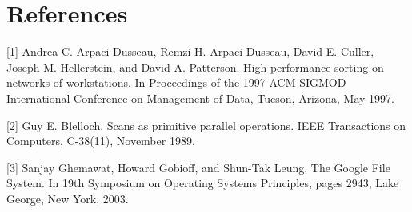 \documentclass[sigconf]{acmart}
\begin{document}
\section{References}



 

[1] Andrea C. Arpaci-Dusseau, Remzi H. Arpaci-Dusseau,
David E. Culler, Joseph M. Hellerstein, and David A. Patterson.
High-performance sorting on networks of workstations.
In Proceedings of the 1997 ACM SIGMOD International
Conference on Management of Data, Tucson,
Arizona, May 1997.

[2] Guy E. Blelloch. Scans as primitive parallel operations.
IEEE Transactions on Computers, C-38(11), November
1989.

[3] Sanjay Ghemawat, Howard Gobioff, and Shun-Tak Leung.
The Google File System. In 19th Symposium on Operating
Systems Principles, pages 2943, Lake George,
New York, 2003.
\end{document}
